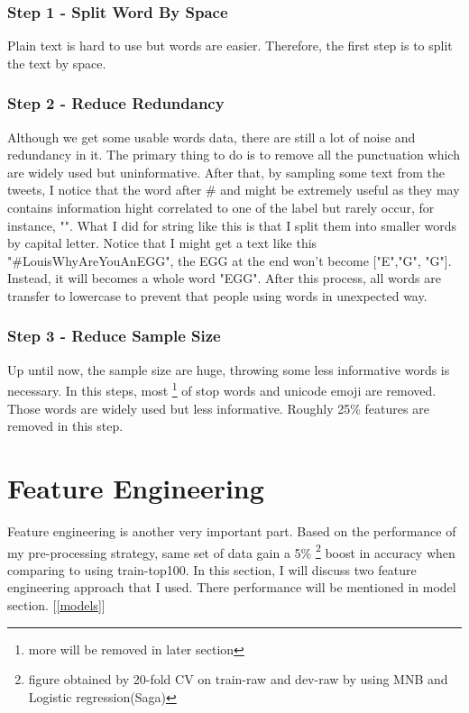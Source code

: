 \documentclass[11pt]{article}
\begin{document}
\subsubsection{Step 1 - Split Word By Space}
Plain text is hard to use but words are easier. Therefore, the first
step is to split the text by space.

\subsubsection{Step 2 - Reduce Redundancy}
Although we get some usable words data, there are still a lot of
noise and redundancy in it.
The primary thing to do is to remove all the punctuation
which are widely used but uninformative.
After that, by sampling some text from the tweets, I notice that the 
word after
\# and \@ might be extremely useful as they may contains information 
hight correlated to one of the label but rarely occur, 
for instance, "". What I did for string like this is
that I split them into smaller words by capital letter. Notice that
I might get a text like this "\#LouisWhyAreYouAnEGG", the EGG at the
end won't become ["E","G", "G"]. Instead, it will becomes a whole word
"EGG". After this process, all words are transfer to lowercase to 
prevent that people using words in unexpected way.

\subsubsection{Step 3 - Reduce Sample Size}
Up until now, the sample size are huge, throwing some less 
informative words is necessary. In this steps, most
\footnote{more will be removed in later section} of stop words
and unicode emoji are removed.
Those words are widely used but less informative.
Roughly 25\% features are removed in this step.


\section{Feature Engineering}
\label{ext}
Feature engineering is another very important part.
Based on the performance of my pre-processing strategy, 
same set of data gain a 5\% 
\footnote{figure obtained by 20-fold CV on train-raw and dev-raw 
by using MNB and Logistic regression(Saga)}
boost in accuracy when comparing to using train-top100.
In this section, I will discuss two feature engineering approach that
I used. There performance will be mentioned in model section.
[\ref{models}]
\end{document}
